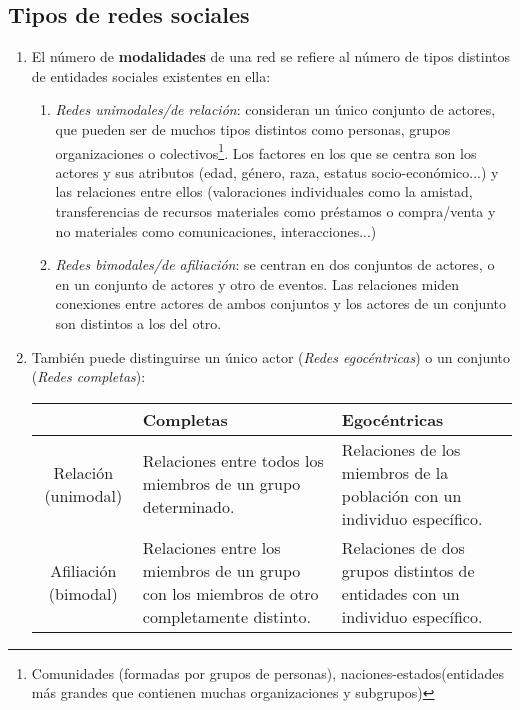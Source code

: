 \documentclass[10pt,spanish, landscape, twocolumn]{article}
\begin{document}
\subsection{\textcolor{tematres}Tipos de redes sociales}
\begin{enumerate}[\color{tematres}{$\leadsto$}]
    \item El número de \textbf{\textcolor{tematres}{modalidades}} de una red se refiere al número de tipos distintos de entidades sociales existentes en ella:

    \begin{enumerate}[---]
        \item \textit{\textcolor{tematres}{Redes unimodales/de relación}}: consideran un único conjunto de actores, que pueden ser de muchos tipos distintos como personas, grupos organizaciones o colectivos\footnote{Comunidades (formadas por grupos de personas), naciones-estados(entidades más grandes que contienen muchas organizaciones y subgrupos)}. Los factores en los que se centra son los actores y sus atributos (edad, género, raza, estatus socio-económico...) y las relaciones entre ellos (valoraciones individuales como la amistad, transferencias de recursos materiales como préstamos o compra/venta y no materiales como comunicaciones, interacciones...)
        \item \textit{\textcolor{tematres}{Redes bimodales/de afiliación}}: se centran en dos conjuntos de actores, o en un conjunto de actores y otro de eventos. Las relaciones miden conexiones entre actores de ambos conjuntos y los actores de un conjunto son distintos a los del otro.
    \end{enumerate}

    \item También puede distinguirse un único actor (\textit{\textcolor{tematres}{Redes egocéntricas}}) o un conjunto (\textit{\textcolor{tematres}{Redes completas}}):
    
    \begin{tabular}{c | p{3cm} | p{3cm}}
     & Completas & Egocéntricas \\
     \hline
    Relación (unimodal) & Relaciones entre todos los miembros de un grupo determinado. & Relaciones de los miembros de la población con un individuo específico. \\
    \hline
    Afiliación (bimodal) & Relaciones entre los miembros de un grupo con los miembros de otro completamente distinto. & Relaciones de dos grupos distintos de entidades con un individuo específico. \\

    \end{tabular}
\end{enumerate}
\end{document}
